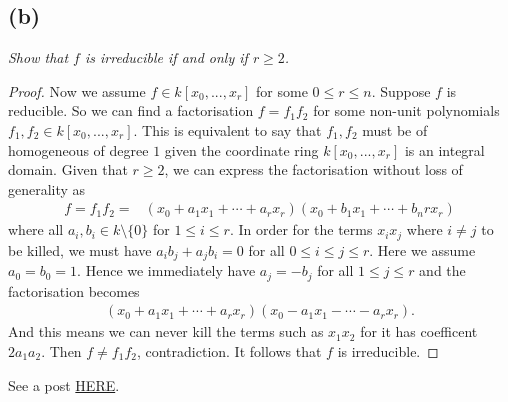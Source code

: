 \subsection{(b)}

\textit{Show that $f$ is irreducible if and only if $r\geq 2$.}

\begin{proof}
    Now we assume $f\in k[x_0,...,x_r]$ for some $0\leq r\leq n$.
    Suppose $f$ is reducible. So we can find a factorisation $f=f_1f_2$ for some non-unit polynomials $f_1,f_2\in k[x_0,...,x_r]$. This is equivalent to say that $f_1,f_2$ must be of homogeneous of degree $1$ given the coordinate ring $k[x_0,...,x_r]$ is an integral domain. 
    Given that $r\geq 2$, we can express the factorisation without loss of generality as 
    \begin{align*}
        f=f_1f_2=&(x_0+a_1x_1+\cdots+a_rx_r)(x_0+b_1x_1+\cdots+b_n
        rx_r)
    \end{align*}where all $a_i,b_i\in k\setminus \{0\}$ for $1\leq i\leq r$. 
    In order for the terms $x_ix_j$ where $i\neq j$ to be killed, we must have $a_ib_j+a_jb_i=0$ for all $0\leq i\leq j\leq r$. Here we assume $a_0=b_0=1$. Hence we immediately have $a_j=-b_j$ for all $1\leq j\leq r$ and the factorisation becomes 
    \begin{align*}
        (x_0+a_1x_1+\cdots+a_rx_r)(x_0-a_1x_1-\cdots-a_rx_r).
    \end{align*}
    And this means we can never kill the terms such as $x_1x_2$ for it has coefficent $2a_1a_2$. Then $f\neq f_1f_2$, contradiction. It follows that $f$ is irreducible.
    
\end{proof}

See a post \href{https://math.stackexchange.com/questions/39457/irreducibility-criteria-for-homogeneous-polynomials}{HERE}.